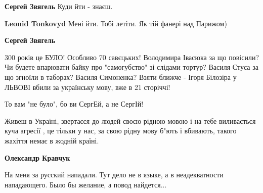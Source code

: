 \begin{itemize}
\begin{itemize}
 
\textbf{Сергей Звягель} Куди йти - знаєш.

 
\textbf{Leonid Tonkovyd} Мені йти. Тобі летіти. Як тій фанері над Парижом)

 
\textbf{Сергей Звягель} 

300 років це БУЛО! Особливо 70 савєцьких! Володимира Івасюка за що повісили? Чи
будете впарювати байку про "самогубство" зі слідами тортур? Василя Стуса за що
згноїли в таборах? Василя Симоненка? Взяти ближче - Ігоря Білозіра у ЛЬВОВІ
вбили за українську мову, вже в 21 сторіччі!

То вам "не було", бо ви СергЕй, а не СергІй!

\end{itemize}

 

Живеш в Україні, звертаєся до людей своєю рідною мовою і на тебе виливається
куча агресії , це тільки у нас, за свою рідну мову б"ють і вбивають, такого
жахіття немає в жодній країні.


 
\textbf{Олександр Кравчук} 

На меня за русский нападали. Тут дело не в языке, а в неадекватности
нападающего. Было бы желание, а повод найдется...


\end{itemize}
